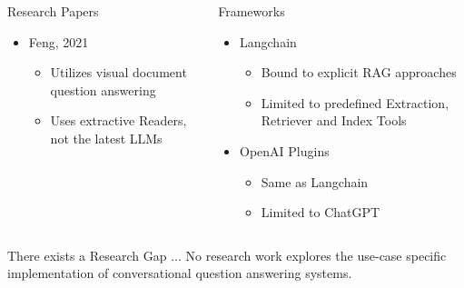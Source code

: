 \documentclass{beamer}
\begin{document}
{\begin{overprint}
\begin{columns}[t]
    \end{columns}
    \vfill
      \begin{columns}[t]
        \begin{column}{.5\textwidth}
        {\color{unirot}Research Papers}
        \begin{itemize}
          \item Feng, 2021
          \begin{itemize}
            \item Utilizes visual document question answering
            \item Uses extractive Readers, not the latest LLMs
          \end{itemize}
        \end{itemize}
        \end{column}
    
    
        \begin{column}{.5\textwidth}
        {\color{unirot}Frameworks} 
        \begin{itemize}
          \item Langchain
          \begin{itemize}
            \item Bound to explicit RAG approaches
            \item Limited to predefined Extraction, Retriever and Index Tools 
          \end{itemize}
          \item OpenAI Plugins
            \begin{itemize}
              \item Same as Langchain
              \item Limited to ChatGPT
            \end{itemize}
        \end{itemize}
        \end{column}
    
        \end{columns}
        \vfill
    \begin{block}{There exists a Research Gap ...}
    No research work explores the use-case specific implementation of conversational question answering systems.
    \end{block}
  \end{overprint}
}
\end{document}
